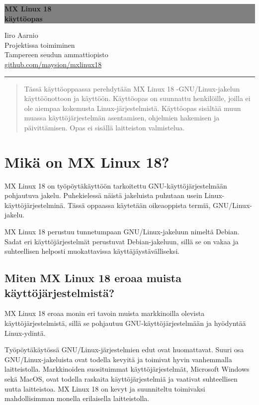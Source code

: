 \documentclass[a4paper, 12pt, finnish]{article}
\begin{document}
\begin{titlepage}
	\colorbox{grey}{
		\parbox[t]{0.93\textwidth}{
			\parbox[t]{0.91\textwidth}{ 
				\raggedleft 
				\fontsize{80pt}{80pt}\selectfont 
				\vspace{0.7cm} 
				\textbf{MX Linux 18\\
				käyttöopas\\}
				\vspace{0.7cm}  
			}
		}
	}
	\vfill
	\parbox[t]{0.93\textwidth}{ 
		\raggedleft 
		\large 
		{\Large Iiro Aarnio}\\[4pt] 
		Projektissa toimiminen\\
		Tampereen seudun ammattiopisto\\[4pt] 
		\url{github.com/maysion/mxlinux18}\\
		\hfill\rule{0.2\linewidth}{1pt}
	}
\end{titlepage}
\thispagestyle{empty}
\begin{abstract}
	Tässä käyttöoppaassa perehdytään MX Linux 18 -GNU/Linux-jakelun käyttöönottoon ja käyttöön. Käyttöopas on suunnattu henkilöille, joilla ei ole aiempaa kokemusta Linux-järjestelmistä. Käyttöopas sisältää muun muassa käyttöjärjestelmän asentamisen, ohjelmien hakemisen ja päivittämisen. Opas ei sisällä laitteiston valmistelua.
\end{abstract}

\newpage
\thispagestyle{empty} 
\tableofcontents
\newpage
{} 
\setcounter{page}{1} 
\newpage


\section{Mikä on MX Linux 18?}
MX Linux 18 on työpöytäkäyttöön tarkoitettu GNU-käyttöjärjestelmään pohjautuva jakelu. Puhekielessä näistä jakeluista puhutaan usein Linux-käyttöjärjestelminä. Tässä oppaassa käytetään oikeaoppista termiä, GNU/Linux-jakelu.

MX Linux 18 perustuu tunnetumpaan GNU/Linux-jakeluun nimeltä Debian. Sadat eri käyttöjärjestelmät perustuvat Debian-jakeluun, sillä se on vakaa ja suhteellisen helposti muokattavissa käyttäjäystävälliseksi.

\subsection{Miten MX Linux 18 eroaa muista käyttöjärjestelmistä?}
MX Linux 18 eroaa monin eri tavoin muista markkinoilla olevista käyttöjärjestelmistä, sillä se pohjautuu GNU-käyttöjärjestelmään ja hyödyntää Linux-ydintä. 

Työpöytäkäytössä GNU/Linux-järjestelmien edut ovat huomattavat. Suuri osa GNU/Linux-jakeluista ovat todella kevyitä ja toimivat hyvin vanhemmalla laitteistolla. Markkinoiden suosituimmat käyttöjärjestelmät, Microsoft Windows sekä MacOS, ovat todella raskaita käyttöjärjestelmiä ja vaativat suhteellisen uutta laitteistoa. MX Linux 18 on kevyt ja suunniteltu toimivaksi mahdollisimman monella erilaisella laitteistolla.
\end{document}
